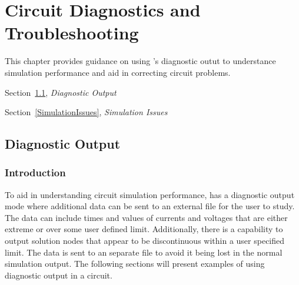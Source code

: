 

\chapter{Circuit Diagnostics and Troubleshooting}
\label{Parallel}

{
This chapter provides guidance on using \Xyce{}'s diagnostic outut to understance simulation performance and aid in correcting
circuit problems.
\begin{XyceItemize}
\item Section~\ref{DiagnosticOutput}, {\em Diagnostic Output}
\item Section~\ref{SimulationIssues}, {\em Simulation Issues}
\end{XyceItemize}
}

\section{Diagnostic Output}
\label{DiagnosticOutput}

\subsection{Introduction}
To aid in understanding circuit simulation performance, \Xyce{} has a diagnostic output mode
where additional data can be sent to an external file for the user to study.  The data 
can include times and values of currents and voltages that are either extreme or over some
user defined limit.  Additionally, there is a capability to output solution nodes that 
appear to be discontinuous within a user specified limit.  The data is sent to an separate
file to avoid it being lost in the normal simulation output.  The following sections will
present examples of using diagnostic output in a circuit.


